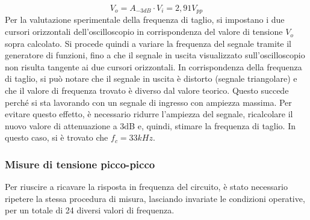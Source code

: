 \[V_o=A_{-3dB} \cdot V_i=2,91V_{pp}\]
Per la valutazione sperimentale della frequenza di taglio, si impostano i due cursori orizzontali dell’oscilloscopio in corrispondenza del valore di tensione \(V_o\) sopra calcolato. Si procede quindi a variare la frequenza del segnale tramite il generatore di funzioni, fino a che il segnale in uscita visualizzato sull’oscilloscopio non risulta tangente ai due cursori orizzontali. In corrispondenza della frequenza di taglio, si può notare che il segnale in uscita è distorto (segnale triangolare) e che il valore di frequenza trovato è diverso dal valore teorico. Questo succede perché si sta lavorando con un segnale di ingresso con ampiezza massima. Per evitare questo effetto, è necessario ridurre l’ampiezza del segnale, ricalcolare il nuovo valore di attenuazione a 3dB e, quindi, stimare la frequenza di taglio. In questo caso, si è trovato che \(f_c=33kHz\).
\clearpage
\subsubsection{Misure di tensione picco-picco}

Per riuscire a ricavare la risposta in frequenza del circuito, è stato necessario ripetere la stessa procedura di misura, lasciando invariate le condizioni operative, per un totale di 24 diversi valori di frequenza.

